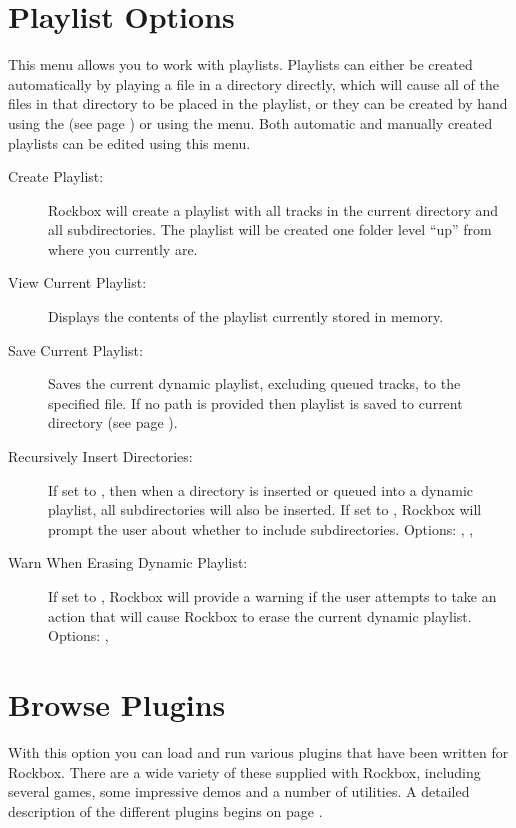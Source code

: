 \section{\label{ref:playlistoptions}Playlist Options}
  This menu allows you to work with playlists. Playlists can either be created
automatically by playing a file in a directory directly, which will cause all 
of the files in that directory to be placed in the playlist, or they can be
created by hand using the  (see page \pageref{ref:Filemenu}) 
or using the  menu.  Both  automatic and manually 
created playlists can be edited using this menu.

\begin{description}
\item[Create Playlist:]
  Rockbox will create a playlist with all tracks in the current directory 
and all subdirectories. The playlist will be created one folder level ``up'' 
from where you currently are.
  
\item[View Current Playlist:]
  Displays the contents of the playlist currently stored in memory.
  
\item[Save Current Playlist:]
  Saves the current dynamic playlist, excluding queued tracks, to the 
specified file. If no path is provided then playlist is saved to current 
directory (see page \pageref{ref:Playlistsubmenu}).
  
\item[Recursively Insert Directories: ]
  If set to , then when a directory is inserted or queued into a 
  dynamic playlist, all subdirectories will also be inserted. If set to ,
  Rockbox will prompt the user about whether to include subdirectories.
  Options: , , 

\item[Warn When Erasing Dynamic Playlist: ]
  If set to , Rockbox will provide a warning if the user attempts to
  take an action that will cause Rockbox to erase the current dynamic playlist.
  Options: , 
\end{description}

\section{Browse Plugins}
  With this option you can load and run various plugins that have been
written for Rockbox. There are a wide variety of these supplied with
Rockbox, including several games, some impressive demos and a number of
utilities. A detailed description of the different plugins begins 
on page \pageref{ref:plugins}.

